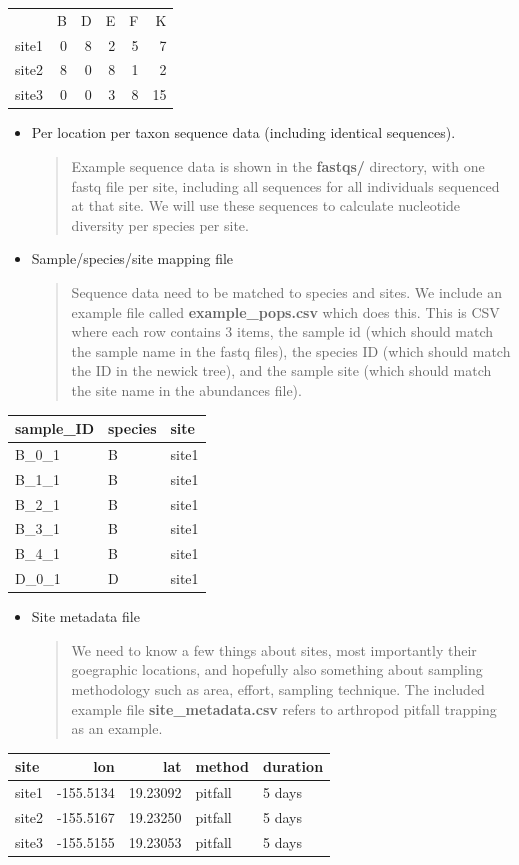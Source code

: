 \documentclass[]{article}
\begin{document}
\begin{longtable}[]{@{}lrrrrr@{}}
& B & D & E & F & K\tabularnewline
site1 & 0 & 8 & 2 & 5 & 7\tabularnewline
site2 & 8 & 0 & 8 & 1 & 2\tabularnewline
site3 & 0 & 0 & 3 & 8 & 15\tabularnewline
\end{longtable}

\begin{itemize}
\item
  Per location per taxon sequence data (including identical sequences).

  \begin{quote}
  Example sequence data is shown in the \textbf{fastqs/} directory, with
  one fastq file per site, including all sequences for all individuals
  sequenced at that site. We will use these sequences to calculate
  nucleotide diversity per species per site.
  \end{quote}
\item
  Sample/species/site mapping file

  \begin{quote}
  Sequence data need to be matched to species and sites. We include an
  example file called \textbf{example\_pops.csv} which does this. This
  is CSV where each row contains 3 items, the sample id (which should
  match the sample name in the fastq files), the species ID (which
  should match the ID in the newick tree), and the sample site (which
  should match the site name in the abundances file).
  \end{quote}
\end{itemize}

\begin{longtable}[]{@{}lll@{}}
\toprule
sample\_ID & species & site\tabularnewline
\midrule
\endhead
B\_0\_1 & B & site1\tabularnewline
B\_1\_1 & B & site1\tabularnewline
B\_2\_1 & B & site1\tabularnewline
B\_3\_1 & B & site1\tabularnewline
B\_4\_1 & B & site1\tabularnewline
D\_0\_1 & D & site1\tabularnewline
\bottomrule
\end{longtable}

\begin{itemize}
\item
  Site metadata file

  \begin{quote}
  We need to know a few things about sites, most importantly their
  goegraphic locations, and hopefully also something about sampling
  methodology such as area, effort, sampling technique. The included
  example file \textbf{site\_metadata.csv} refers to arthropod pitfall
  trapping as an example.
  \end{quote}
\end{itemize}

\begin{longtable}[]{@{}lrrll@{}}
\toprule
site & lon & lat & method & duration\tabularnewline
\midrule
\endhead
site1 & -155.5134 & 19.23092 & pitfall & 5 days\tabularnewline
site2 & -155.5167 & 19.23250 & pitfall & 5 days\tabularnewline
site3 & -155.5155 & 19.23053 & pitfall & 5 days\tabularnewline
\bottomrule
\end{longtable}
\end{document}
